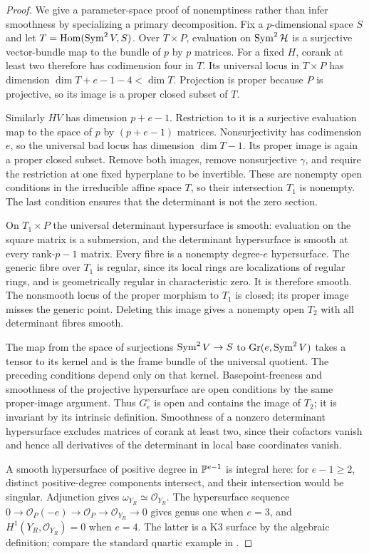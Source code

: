 \begin{proof}
We give a parameter-space proof of nonemptiness rather than infer
smoothness by specializing a primary decomposition. Fix a $p$-dimensional
space $S$ and let $T=\operatorname{Hom}(\operatorname{Sym}^2V,S)$. Over $T\times P$,
evaluation on $\operatorname{Sym}^2\mathcal H$ is a surjective vector-bundle map to
the bundle of $p$ by $p$ matrices. For a fixed $H$, corank at least two
therefore has codimension four in $T$. Its universal locus in
$T\times P$ has dimension $\dim T+e-1-4<\dim T$. Projection is
proper because $P$ is projective, so its image is a proper closed
subset of $T$.

Similarly $HV$ has dimension $p+e-1$. Restriction to it is a
surjective evaluation map to the space of $p$ by $(p+e-1)$ matrices.
Nonsurjectivity has codimension $e$, so the universal bad locus has
dimension $\dim T-1$. Its proper image is again a proper closed
subset. Remove both images, remove nonsurjective $\gamma$, and
require the restriction at one fixed hyperplane to be invertible.
These are nonempty open conditions in the irreducible affine space
$T$, so their intersection $T_1$ is nonempty. The last condition
ensures that the determinant is not the zero section.

On $T_1\times P$ the universal determinant hypersurface is smooth:
evaluation on the square matrix is a submersion, and the determinant
hypersurface is smooth at every rank-$p-1$ matrix. Every fibre is a
nonempty degree-$e$ hypersurface. The generic fibre over $T_1$ is regular,
since its local rings are localizations of regular rings, and is
geometrically regular in characteristic zero. It is therefore smooth.
The nonsmooth locus of the proper morphism to $T_1$ is closed; its
proper image misses the generic point. Deleting this image gives a
nonempty open $T_2$ with all determinant fibres smooth.

The map from the space of surjections $\operatorname{Sym}^2V\to S$ to
$\operatorname{Gr}(e,\operatorname{Sym}^2V)$ takes a tensor to its kernel and is the frame
bundle of the universal quotient. The preceding conditions depend
only on that kernel. Basepoint-freeness and smoothness of the
projective hypersurface are open conditions by the same proper-image
argument. Thus $G_e^\circ$ is open and contains the image of $T_2$;
it is invariant by its intrinsic definition. Smoothness of a
nonzero determinant hypersurface excludes matrices of corank at
least two, since their cofactors vanish and hence all derivatives
of the determinant in local base coordinates vanish.

A smooth hypersurface of positive degree in $\mathbb P^{e-1}$ is integral
here: for $e-1\ge2$, distinct positive-degree components intersect,
and their intersection would be singular. Adjunction gives
$\omega_{Y_R}\simeq\mathcal O_{Y_R}$. The hypersurface sequence
$0\to\mathcal O_P(-e)\to\mathcal O_P\to\mathcal O_{Y_R}\to0$
gives genus one when $e=3$, and $H^1(Y_R,\mathcal O_{Y_R})=0$ when
$e=4$. The latter is a K3 surface by the algebraic definition;
compare the standard quartic example in
\cite[Chapter 1, Example 1.3(i)]{HuyK3}.


\end{proof}
